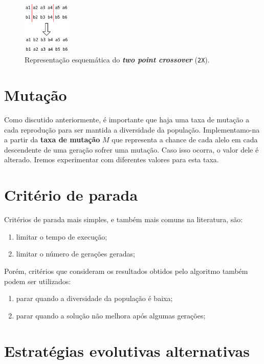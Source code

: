 \documentclass[11pt]{article}
\begin{document}
\begin{figure}
    \centering
    \includegraphics[width=0.2\textwidth]{figures/two_points_crossover.png}
    \caption{Representação esquemática do \textbf{\emph{two point crossover}} (\texttt{2X}).}
    \label{fig:crossover}
\end{figure}

\section{Mutação}

Como discutido anteriormente, é importante que haja uma taxa de mutação a cada reprodução para ser mantida a diversidade da população. Implementamo-na a partir da \textbf{taxa de mutação} \(M\) que representa a chance de cada alelo em cada descendente de uma geração sofrer uma mutação. Caso isso ocorra, o valor dele é alterado. Iremos experimentar com diferentes valores para esta taxa.

\section{Critério de parada}

Critérios de parada mais simples, e também mais comuns na literatura, são:

\begin{enumerate}
    \item limitar o tempo de execução;
    \item limitar o número de gerações geradas;
\end{enumerate} 

Porém, critérios que consideram os resultados obtidos pelo algoritmo também podem ser utilizados:

\begin{enumerate}
    \item parar quando a diversidade da população é baixa;
    \item parar quando a solução não melhora após algumas gerações;
\end{enumerate}

\section{Estratégias evolutivas alternativas}
\label{sec:alternativas}
\end{document}
